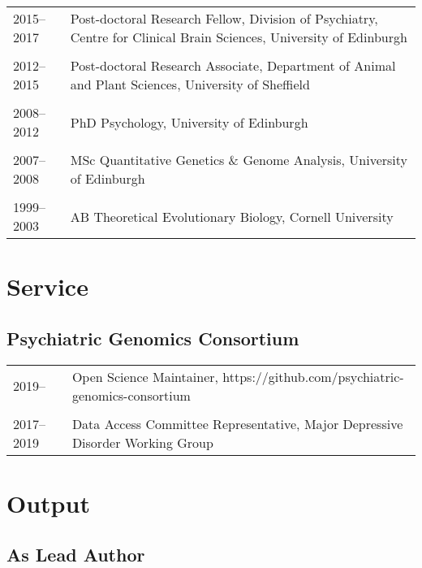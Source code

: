\documentclass[11pt]{article}
\begin{document}
\begin{tabular}{p{3cm}p{12cm}}
2015--2017 & Post-doctoral Research Fellow, Division of Psychiatry, Centre for Clinical Brain Sciences, University of Edinburgh \\ \\

2012--2015 & Post-doctoral Research Associate, Department of Animal and Plant Sciences, University of Sheffield \\ \\

2008--2012 & PhD Psychology, University of Edinburgh \\ \\

2007--2008 & MSc Quantitative Genetics \& Genome Analysis, University of Edinburgh \\ \\

1999–2003 & AB Theoretical Evolutionary Biology, Cornell University

\end{tabular}

\section*{Service}

\subsection*{Psychiatric Genomics Consortium}

\begin{tabular}{p{3cm}p{12cm}}
2019-- & Open Science Maintainer, https://github.com/psychiatric-genomics-consortium \\ \\

2017--2019 & Data Access Committee Representative, Major Depressive Disorder Working Group 

\end{tabular}


\section*{Output}

\subsection*{As Lead Author}

\nocite{*}
\end{document}
